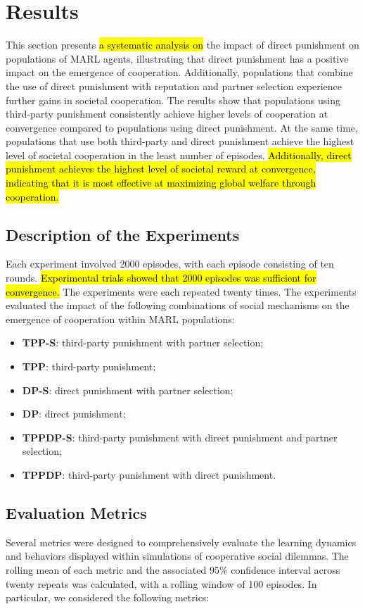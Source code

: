 \documentclass[sn-aps,numbered]{sn-jnl}%
\theoremstyle{thmstyleone}%
\theoremstyle{thmstyletwo}%
\theoremstyle{thmstylethree}%
\begin{document}
\section{Results}

This section presents \hl{a systematic analysis on} the impact of direct punishment on populations of MARL agents, illustrating that direct punishment has a positive impact on the emergence of cooperation. Additionally, populations that combine the use of direct punishment with reputation and partner selection experience further gains in societal cooperation. 
The results show that populations using third-party punishment consistently achieve higher levels of cooperation at convergence compared to populations using direct punishment. At the same time, populations that use both third-party and direct punishment achieve the highest level of societal cooperation in the least number of episodes. \hl{Additionally, direct punishment achieves the highest level of societal reward at convergence, indicating that it is most effective at maximizing global welfare through cooperation.}

\subsection{Description of the Experiments}

Each experiment involved 2000 episodes, with each episode consisting of ten rounds. \hl{Experimental trials showed that 2000 episodes was sufficient for convergence.} The experiments were each repeated twenty times. The experiments evaluated the impact of the following combinations of social mechanisms on the emergence of cooperation within MARL populations:
\begin{itemize}
 \item\textbf{TPP-S}: third-party punishment with partner selection;
 \item \textbf{TPP}: third-party punishment; 
\item \textbf{DP-S}: direct punishment with partner selection;
 \item \textbf{DP}: direct punishment; 
\item \textbf{TPPDP-S}: third-party punishment with direct punishment and partner selection;
\item \textbf{TPPDP}: third-party punishment with direct punishment.
\end{itemize}

\subsection{Evaluation Metrics}
%
Several metrics were designed to comprehensively evaluate the learning dynamics and behaviors displayed within simulations of cooperative social dilemmas. The rolling mean of each metric and the associated 95\% confidence interval across twenty repeats was calculated, with a rolling window of 100 episodes. In particular, we considered the following metrics:
\end{document}
